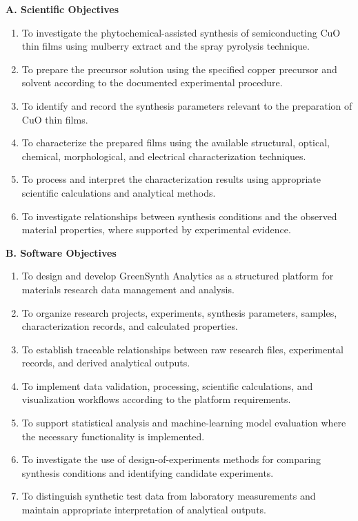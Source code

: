 \documentclass[12pt,a4paper,oneside]{report}
\begin{document}
{{{\noindent\textbf{A. Scientific Objectives}
\begin{enumerate}
    \item To investigate the phytochemical-assisted synthesis of semiconducting $\text{CuO}$ thin films using mulberry extract and the spray pyrolysis technique.
    \item To prepare the precursor solution using the specified copper precursor and solvent according to the documented experimental procedure.
    \item To identify and record the synthesis parameters relevant to the preparation of $\text{CuO}$ thin films.
    \item To characterize the prepared films using the available structural, optical, chemical, morphological, and electrical characterization techniques.
    \item To process and interpret the characterization results using appropriate scientific calculations and analytical methods.
    \item To investigate relationships between synthesis conditions and the observed material properties, where supported by experimental evidence.
\end{enumerate}

\noindent\textbf{B. Software Objectives}
\begin{enumerate}
    \item To design and develop GreenSynth Analytics as a structured platform for materials research data management and analysis.
    \item To organize research projects, experiments, synthesis parameters, samples, characterization records, and calculated properties.
    \item To establish traceable relationships between raw research files, experimental records, and derived analytical outputs.
    \item To implement data validation, processing, scientific calculations, and visualization workflows according to the platform requirements.
    \item To support statistical analysis and machine-learning model evaluation where the necessary functionality is implemented.
    \item To investigate the use of design-of-experiments methods for comparing synthesis conditions and identifying candidate experiments.
    \item To distinguish synthetic test data from laboratory measurements and maintain appropriate interpretation of analytical outputs.
\end{enumerate}

}}}
\end{document}
